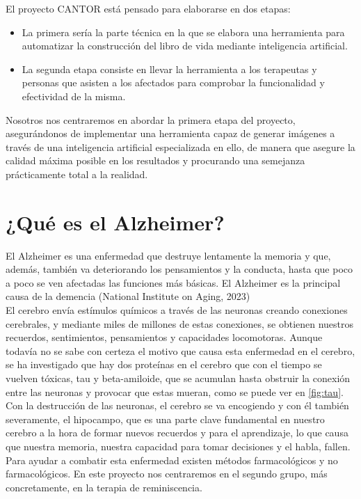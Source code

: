 El proyecto CANTOR está pensado para elaborarse en dos etapas: 
\begin{itemize}
	\item La primera sería la parte técnica en la que se elabora una herramienta para automatizar la construcción del libro de vida mediante inteligencia artificial. 
	\item La segunda etapa consiste en llevar la herramienta a los terapeutas y personas que asisten a los afectados para comprobar la funcionalidad y efectividad de la misma. 
\end{itemize}

Nosotros nos centraremos en abordar la primera etapa del proyecto, asegurándonos de implementar una herramienta capaz de generar imágenes a través de una inteligencia artificial especializada en ello, de manera que asegure la calidad máxima posible en los resultados y procurando una semejanza prácticamente total a la realidad.\\

\section{¿Qué es el Alzheimer?}

El Alzheimer es una enfermedad que destruye lentamente la memoria y que, además, también va deteriorando los pensamientos y la conducta, hasta que poco a poco se ven afectadas las funciones más básicas. El Alzheimer es la principal causa de la demencia (National Institute on Aging, 2023)\\

El cerebro envía estímulos químicos a través de las neuronas creando conexiones cerebrales, y mediante miles de millones de estas conexiones, se obtienen nuestros recuerdos, sentimientos, pensamientos y capacidades locomotoras. Aunque todavía no se sabe con certeza el motivo que causa esta enfermedad en el cerebro, se ha investigado que hay dos proteínas en el cerebro que con el tiempo se vuelven tóxicas, tau y beta-amiloide, que se acumulan hasta obstruir la conexión entre las neuronas y provocar que estas mueran, como se puede ver en \ref{fig:tau}.  Con la destrucción de las neuronas, el cerebro se va encogiendo y con él también severamente, el hipocampo, que es una parte clave fundamental en nuestro cerebro a la hora de formar nuevos recuerdos y para el aprendizaje, lo que causa que nuestra memoria, nuestra capacidad para tomar decisiones y el habla, fallen. Para ayudar a combatir esta enfermedad existen métodos farmacológicos y no farmacológicos. En este proyecto nos centraremos en el segundo grupo, más concretamente, en la terapia de reminiscencia. \\

